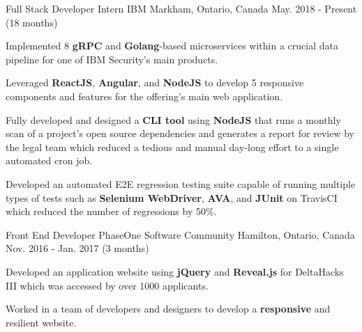 


\begin{cventries}


\cventry
{Full Stack Developer Intern} %
{IBM} %
{Markham, Ontario, Canada} %
{May. 2018 - Present (18 months)} %
{ %
\begin{cvitems}
\item {Implemented 8 \textbf{gRPC} and \textbf{Golang}-based microservices within a crucial data pipeline for one of IBM Security's main products.}
\item {Leveraged \textbf{ReactJS}, \textbf{Angular}, and \textbf{NodeJS} to develop 5 responsive components and features for the offering's main web application.}
\item {Fully developed and designed a \textbf{CLI tool} using \textbf{NodeJS} that runs a monthly scan of a project's open source dependencies and generates a report for review by the legal team which reduced a tedious and manual day-long effort to a single automated cron job.}
\item {Developed an automated E2E regression testing suite capable of running multiple types of tests such as \textbf{Selenium WebDriver}, \textbf{AVA}, and \textbf{JUnit} on TravisCI which reduced the number of regressions by 50\%.}
\end{cvitems}
}


\cventry
{Front End Developer} %
{PhaseOne Software Community} %
{Hamilton, Ontario, Canada} %
{Nov. 2016 - Jan. 2017 (3 months)} %
{ %
\begin{cvitems}
\item {Developed an application website using \textbf{jQuery} and \textbf{Reveal.js} for DeltaHacks III which was accessed by over 1000 applicants.}
\item {Worked in a team of developers and designers to develop a \textbf{responsive} and resilient website.}
\end{cvitems}
}


\end{cventries}